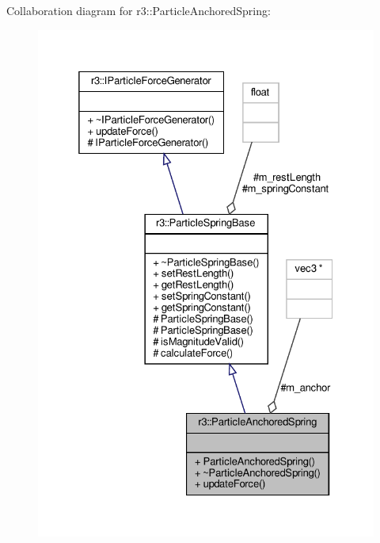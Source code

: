 Collaboration diagram for r3\+:\+:Particle\+Anchored\+Spring\+:\nopagebreak
\begin{figure}[H]
\begin{center}
\leavevmode
\includegraphics[width=350pt]{classr3_1_1_particle_anchored_spring__coll__graph}
\end{center}
\end{figure}
